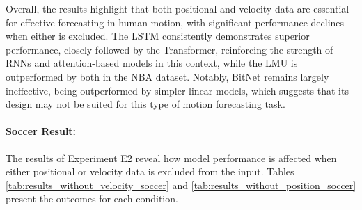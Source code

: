 Overall, the results highlight that both positional and velocity data are essential for effective forecasting in human motion, with significant performance declines when either is excluded. The LSTM consistently demonstrates superior performance, closely followed by the Transformer, reinforcing the strength of RNNs and attention-based models in this context, while the LMU is outperformed by both in the NBA dataset. Notably, BitNet remains largely ineffective, being outperformed by simpler linear models, which suggests that its design may not be suited for this type of motion forecasting task.

\paragraph{Soccer Result:}
The results of Experiment E2 reveal how model performance is affected when either positional or velocity data is excluded from the input. Tables \ref{tab:results_without_velocity_soccer} and \ref{tab:results_without_position_soccer} present the outcomes for each condition.

